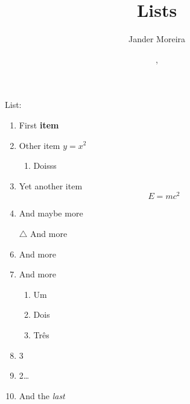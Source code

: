 \documentclass[12pt]{article}
\title{Lists}
\author{Jander Moreira}
\date{\monthname, \the\year}
\begin{document}
\maketitle

List:
\begin{enumerate}
    [label = {\Roman*)}]%
    \item First \textbf{item}
    \item Other item $y = x^2$
    \begin{enumerate}
        \item Doisss
    \end{enumerate}
    \item Yet another item
    \begin{equation}
        E = mc^2\label{eq:equation}
    \end{equation}
    \item And maybe more
    \item [$\triangle$]And more
    \item And more
    \item And more
    \begin{enumerate}
        \item Um
        \item <3>Dois
        \item Três
    \end{enumerate}
    \item 3
    \item 2\ldots
    \item And the \textit{last}
\end{enumerate}
\end{document}
